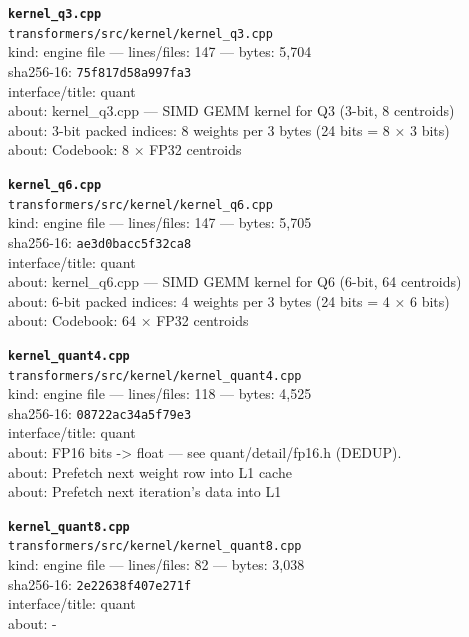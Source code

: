 \noindent\textbf{\texttt{kernel\_q3.cpp}}\\
\texttt{transformers/src/kernel/kernel\_q3.cpp}\\
kind: engine file --- lines/files: 147 --- bytes: 5,704\\
sha256-16: \texttt{75f817d58a997fa3}\\
interface/title: quant\\
about: kernel\_q3.cpp — SIMD GEMM kernel for Q3 (3-bit, 8 centroids)\\
about: 3-bit packed indices: 8 weights per 3 bytes (24 bits = 8 × 3 bits)\\
about: Codebook: 8 × FP32 centroids\\
\vspace*{6.0pt}

\noindent\textbf{\texttt{kernel\_q6.cpp}}\\
\texttt{transformers/src/kernel/kernel\_q6.cpp}\\
kind: engine file --- lines/files: 147 --- bytes: 5,705\\
sha256-16: \texttt{ae3d0bacc5f32ca8}\\
interface/title: quant\\
about: kernel\_q6.cpp — SIMD GEMM kernel for Q6 (6-bit, 64 centroids)\\
about: 6-bit packed indices: 4 weights per 3 bytes (24 bits = 4 × 6 bits)\\
about: Codebook: 64 × FP32 centroids\\
\vspace*{6.0pt}

\noindent\textbf{\texttt{kernel\_quant4.cpp}}\\
\texttt{transformers/src/kernel/kernel\_quant4.cpp}\\
kind: engine file --- lines/files: 118 --- bytes: 4,525\\
sha256-16: \texttt{08722ac34a5f79e3}\\
interface/title: quant\\
about: FP16 bits -> float — see quant/detail/fp16.h (DEDUP).\\
about: Prefetch next weight row into L1 cache\\
about: Prefetch next iteration's data into L1\\
\vspace*{6.0pt}
\newpage

\noindent\textbf{\texttt{kernel\_quant8.cpp}}\\
\texttt{transformers/src/kernel/kernel\_quant8.cpp}\\
kind: engine file --- lines/files: 82 --- bytes: 3,038\\
sha256-16: \texttt{2e22638f407e271f}\\
interface/title: quant\\
about: -\\
\vspace*{6.0pt}

